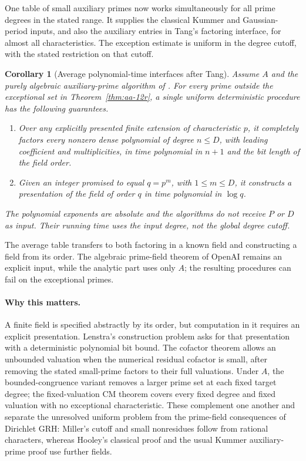 \documentclass[11pt]{article}
\newtheorem{corollary}[theorem]{Corollary}
\theoremstyle{definition}
\theoremstyle{remark}
\begin{document}
One table of small auxiliary primes now works simultaneously for all
prime degrees in the stated range. It supplies the classical
Kummer and Gaussian-period inputs, and also the auxiliary entries in
Tang's factoring interface, for almost all characteristics. The
exception estimate is uniform in the degree cutoff, with the stated
restriction on that cutoff.


\begin{corollary}[Average polynomial-time interfaces after Tang]\label{cor:aa-finite-field-algorithms}
Assume \(A\) and the purely algebraic auxiliary-prime algorithm
of \citet[Theorem~1.2, p.~3; Proposition~10.1, pp.~41--44]{OpenAI2026}.
For every prime outside the exceptional set in
Theorem~\ref{thm:aa-12r}, a single uniform deterministic procedure
has the following guarantees.
\begin{enumerate}
 \item Over any explicitly presented finite extension of characteristic
 \(p\), it completely factors every nonzero dense polynomial of degree
 \(n\leq D\), with leading coefficient and multiplicities, in time
 polynomial in \(n+1\) and the bit length of the field order.
 \item Given an integer promised to equal \(q=p^m\), with
 \(1\leq m\leq D\), it constructs a presentation of the field of order
 \(q\) in time polynomial in \(\log q\).
\end{enumerate}
The polynomial exponents are absolute and the algorithms do not
receive \(P\) or \(D\) as input. Their running time uses the input degree, not the global degree cutoff.
\end{corollary}

The average table transfers to both factoring in a known field and
constructing a field from its order. The algebraic prime-field theorem
of OpenAI remains an explicit input, while the analytic part uses only
\(A\); the resulting procedures can fail on the exceptional primes.


\paragraph{Why this matters.}
A finite field is specified abstractly by its order, but computation in
it requires an explicit presentation. Lenstra's construction problem
asks for that presentation with a deterministic polynomial bit bound.
The cofactor theorem allows an unbounded valuation when the numerical
residual cofactor is small, after removing the stated small-prime
factors to their full valuations. Under \(A\), the bounded-congruence
variant removes a larger prime set at each fixed target degree; the
fixed-valuation CM theorem covers every fixed degree and fixed
valuation with no exceptional characteristic. These complement one
another and separate the unresolved uniform problem from the
prime-field consequences of Dirichlet GRH: Miller's cutoff and small
nonresidues follow from rational characters, whereas Hooley's classical
proof and the usual Kummer auxiliary-prime proof use further fields.
\end{document}
